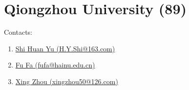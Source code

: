\section{Qiongzhou University (89)}
\label{sec:QU}

Contacts:
\begin{enumerate}
 \item {}\href{mailto:H.Y.Shi@163.com}{Shi Huan Yu (H.Y.Shi@163.com)}
 \item {}\href{mailto:fufa@hainu.edu.cn}{Fu Fa (fufa@hainu.edu.cn)}
 \item {}\href{mailto:xingzhou50@126.com}{Xing Zhou (xingzhou50@126.com)}
\end{enumerate}

